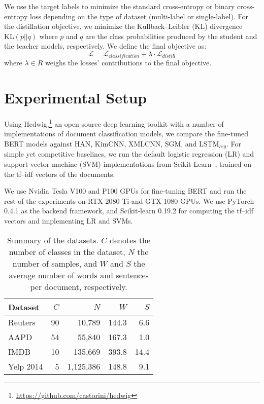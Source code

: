 \documentclass[11pt,a4paper]{article}
\newcommand{\BLSTMR}[1]{LSTM$_{reg}$}
\begin{document}
We use the target labels to minimize the standard cross-entropy or binary cross-entropy loss depending on the type of dataset (multi-label or single-label).
For the distillation objective, we minimize the Kullback--Leibler (KL) divergence $\textrm{KL}(p || q)$ where $p$ and $q$ are the class probabilities produced by the student and the teacher models, respectively. We define the final objective as:
\begin{equation}
    \label{eq:loss}
    \mathcal{L} = \mathcal{L}_{classification} + \lambda \cdot \mathcal{L}_{distill}
\end{equation}
where $\lambda \in R$  weighs the losses' contributions to the final objective.

\section{Experimental Setup}

\renewcommand*{\thefootnote}{\arabic{footnote}}

Using Hedwig,\footnote{\url{https://github.com/castorini/hedwig}} an open-source deep learning toolkit with a number of implementations of document classification models, we compare the fine-tuned BERT models against HAN, KimCNN, XMLCNN, SGM, and \BLSTMR{}.
For simple yet competitive baselines, we run the default logistic regression (LR) and support vector machine (SVM) implementations from Scikit-Learn~\cite{scikit-learn}, trained on the tf--idf vectors of the documents.

We use Nvidia Tesla V100 and P100 GPUs for fine-tuning BERT and run the rest of the experiments on RTX 2080 Ti and GTX 1080 GPUs.
We use PyTorch 0.4.1 as the backend framework, and Scikit-learn 0.19.2 for computing the tf--idf vectors and implementing LR and SVMs.

\begin{table}
\centering
\begin{tabular}{lrrrr}
\toprule[1pt]
Dataset & $C$ & $N$ & $W$ & $S$ \\
\midrule
Reuters & 90 & 10,789 & 144.3 & 6.6 \\
AAPD & 54 & 55,840 & 167.3 & 1.0 \\
IMDB & 10 & 135,669 & 393.8 & 14.4 \\
Yelp 2014 & 5 & 1,125,386 & 148.8 & 9.1 \\ \bottomrule[1pt]
\end{tabular}
\caption{Summary of the datasets. $C$ denotes the number of classes in the dataset, $N$ the number of samples, and $W$ and $S$ the average number of words and sentences per document, respectively.}
\label{table:datasets}
\end{table}
\end{document}

